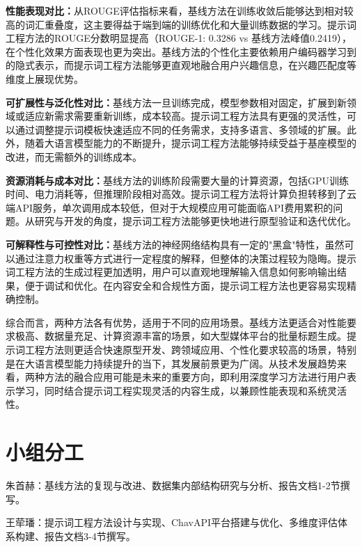 \documentclass[10pt,a4paper]{article}
\begin{document}
\textbf{性能表现对比：}从ROUGE评估指标来看，基线方法在训练收敛后能够达到相对较高的词汇重叠度，这主要得益于端到端的训练优化和大量训练数据的学习。提示词工程方法的ROUGE分数明显提高（ROUGE-1: 0.3286 vs 基线方法峰值0.2419），在个性化效果方面表现也更为突出。基线方法的个性化主要依赖用户编码器学习到的隐式表示，而提示词工程方法能够更直观地融合用户兴趣信息，在兴趣匹配度等维度上展现优势。

\textbf{可扩展性与泛化性对比：}基线方法一旦训练完成，模型参数相对固定，扩展到新领域或适应新需求需要重新训练，成本较高。提示词工程方法具有更强的灵活性，可以通过调整提示词模板快速适应不同的任务需求，支持多语言、多领域的扩展。此外，随着大语言模型能力的不断提升，提示词工程方法能够持续受益于基座模型的改进，而无需额外的训练成本。

\textbf{资源消耗与成本对比：}基线方法的训练阶段需要大量的计算资源，包括GPU训练时间、电力消耗等，但推理阶段相对高效。提示词工程方法将计算负担转移到了云端API服务，单次调用成本较低，但对于大规模应用可能面临API费用累积的问题。从研究与开发的角度，提示词工程方法能够更快地进行原型验证和迭代优化。

\textbf{可解释性与可控性对比：}基线方法的神经网络结构具有一定的"黑盒"特性，虽然可以通过注意力权重等方式进行一定程度的解释，但整体的决策过程较为隐晦。提示词工程方法的生成过程更加透明，用户可以直观地理解输入信息如何影响输出结果，便于调试和优化。在内容安全和合规性方面，提示词工程方法也更容易实现精确控制。

综合而言，两种方法各有优势，适用于不同的应用场景。基线方法更适合对性能要求极高、数据量充足、计算资源丰富的场景，如大型媒体平台的批量标题生成。提示词工程方法则更适合快速原型开发、跨领域应用、个性化要求较高的场景，特别是在大语言模型能力持续提升的当下，其发展前景更为广阔。从技术发展趋势来看，两种方法的融合应用可能是未来的重要方向，即利用深度学习方法进行用户表示学习，同时结合提示词工程实现灵活的内容生成，以兼顾性能表现和系统灵活性。

\section{小组分工}
朱首赫：基线方法的复现与改进、数据集内部结构研究与分析、报告文档1-2节撰写。

王荦璠：提示词工程方法设计与实现、ChavAPI平台搭建与优化、多维度评估体系构建、报告文档3-4节撰写。
\end{document}
